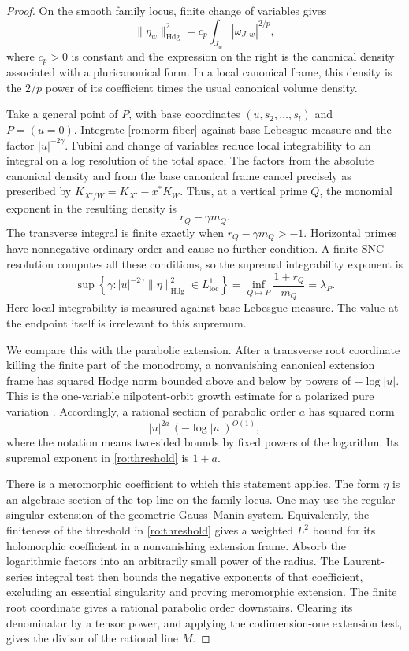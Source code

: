 \begin{proof}
On the smooth family locus, finite change of variables gives
\begin{equation}
 \|\eta_w\|_{\mathrm{Hdg}}^2
   =c_p\int_{J_w}|\omega_{J,w}|^{2/p},
 \label{ro:norm-fiber}
\end{equation}
where $c_p>0$ is constant and the expression on the right is the
canonical density associated with a pluricanonical form.  In a local
canonical frame, this density is the $2/p$ power of its coefficient
times the usual canonical volume density.

Take a general point of $P$, with base coordinates $(u,s_2,\ldots,s_l)$
and $P=(u=0)$.  Integrate \eqref{ro:norm-fiber} against base Lebesgue
measure and the factor $|u|^{-2\gamma}$.  Fubini and change of variables
reduce local integrability to an integral on a log resolution of the
total space.  The factors from the absolute canonical density and from
the base canonical frame cancel precisely as prescribed by
$K_{X'/W}=K_{X'}-x^*K_W$.  Thus, at a vertical prime $Q$, the monomial
exponent in the resulting density is
\[
 r_Q-\gamma m_Q.
\]
The transverse integral is finite exactly when
$r_Q-\gamma m_Q>-1$.  Horizontal primes have nonnegative ordinary order
and cause no further condition.  A finite SNC resolution computes all
these conditions, so the supremal integrability exponent is
\begin{equation}
 \sup\left\{\gamma:
 |u|^{-2\gamma}\|\eta\|_{\mathrm{Hdg}}^2\in L^1_{\mathrm{loc}}
 \right\}
 =\inf_{Q\mapsto P}\frac{1+r_Q}{m_Q}
 =\lambda_P.
 \label{ro:threshold}
\end{equation}
Here local integrability is measured against base Lebesgue measure.
The value at the endpoint itself is irrelevant to this supremum.

We compare this with the parabolic extension.  After a transverse root
coordinate killing the finite part of the monodromy, a nonvanishing
canonical extension frame has squared Hodge norm bounded above and
below by powers of $-\log|u|$.  This is the one-variable
nilpotent-orbit growth estimate for a polarized pure variation
\cite[\S\S4 and 6]{Schmid}.  Accordingly, a rational section of
parabolic order $a$ has squared norm
\[
 |u|^{2a}\,(-\log|u|)^{O(1)},
\]
where the notation means two-sided bounds by fixed powers of the
logarithm.  Its supremal exponent in \eqref{ro:threshold} is $1+a$.

There is a meromorphic coefficient to which this statement applies.
The form $\eta$ is an algebraic section of the top line on the
family locus.  One may use the regular-singular extension of the
geometric Gauss--Manin system.  Equivalently, the finiteness of the
threshold in \eqref{ro:threshold} gives a weighted $L^2$ bound for its
holomorphic coefficient in a nonvanishing extension frame.  Absorb the
logarithmic factors into an arbitrarily small power of the radius.  The
Laurent-series integral test then bounds the negative exponents of that
coefficient, excluding an essential singularity and proving meromorphic
extension.  The finite root coordinate gives a rational parabolic order
downstairs.  Clearing its denominator by a tensor power, and applying
the codimension-one extension test, gives the divisor of the rational
line $M$.


\end{proof}
